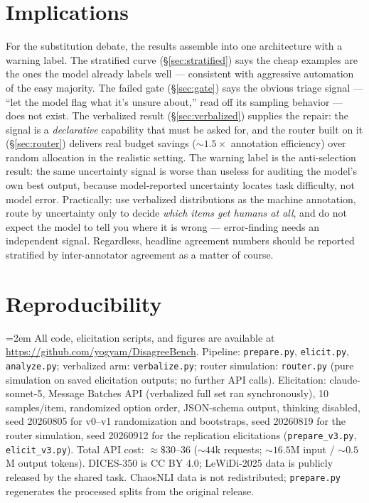 \documentclass[11pt]{article}
\begin{document}
\section{Implications}
\label{sec:implications}

For the substitution debate, the results assemble into one architecture with a warning label. The stratified curve (\S\ref{sec:stratified}) says the cheap examples are the ones the model already labels well --- consistent with aggressive automation of the easy majority. The failed gate (\S\ref{sec:gate}) says the obvious triage signal --- ``let the model flag what it's unsure about,'' read off its sampling behavior --- does not exist. The verbalized result (\S\ref{sec:verbalized}) supplies the repair: the signal is a \emph{declarative} capability that must be asked for, and the router built on it (\S\ref{sec:router}) delivers real budget savings (${\sim}1.5\times$ annotation efficiency) over random allocation in the realistic setting. The warning label is the anti-selection result: the same uncertainty signal is worse than useless for auditing the model's own best output, because model-reported uncertainty locates task difficulty, not model error. Practically: use verbalized distributions as the machine annotation, route by uncertainty only to decide \emph{which items get humans at all}, and do not expect the model to tell you where it is wrong --- error-finding needs an independent signal. Regardless, headline agreement numbers should be reported stratified by inter-annotator agreement as a matter of course.

\section*{Reproducibility}

{\emergencystretch=2em
All code, elicitation scripts, and figures are available at \url{https://github.com/yogyam/DisagreeBench}. Pipeline: \texttt{prepare.py}, \texttt{elicit.py}, \texttt{analyze.py}; verbalized arm: \texttt{verbalize.py}; router simulation: \texttt{router.py} (pure simulation on saved elicitation outputs; no further API calls). Elicitation: claude-sonnet-5, Message Batches API (verbalized full set ran synchronously), 10 samples/item, randomized option order, JSON-schema output, thinking disabled, seed 20260805 for v0--v1 randomization and bootstraps, seed 20260819 for the router simulation, seed 20260912 for the replication elicitations (\texttt{prepare\_v3.py}, \texttt{elicit\_v3.py}). Total API cost: ${\approx}\$30$--36 (${\sim}44$k requests; ${\sim}16.5$M input / ${\sim}0.5$M output tokens). DICES-350 is CC BY 4.0; LeWiDi-2025 data is publicly released by the shared task. ChaosNLI data is not redistributed; \texttt{prepare.py} regenerates the processed splits from the original release.\par}



\end{document}
